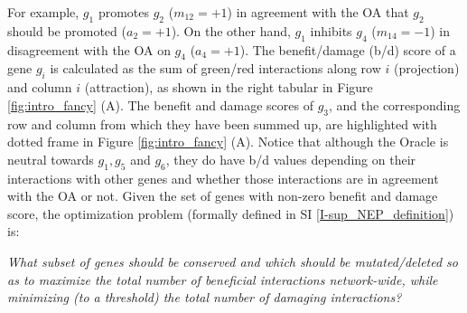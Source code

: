       For example, $g_1$ promotes  $g_2$ ($m_{12}=+1$) in agreement with the OA that $g_2$ should be promoted ($a_2=+1$). On the other hand, $g_1$ inhibits  $g_4$ ($m_{14}=-1$) in disagreement with the OA on $g_4$ ($a_4=+1$). The benefit/damage (b/d) score of a gene $g_i$ is calculated as the sum of green/red interactions along row $i$ (projection) and column $i$ (attraction), as shown in the right tabular in Figure \ref{fig:intro_fancy} (A). The benefit and damage scores of $g_3$, and the corresponding row and column from which they have been summed up, are highlighted with dotted frame in Figure \ref{fig:intro_fancy} (A). Notice that although the Oracle is neutral towards $g_1,g_5$ and $g_6$, they do have b/d values depending on their interactions with other genes and whether those interactions are in agreement with the OA or not.
      Given the set of genes with non-zero benefit and damage score, the optimization problem (formally defined in SI \ref{I-sup_NEP_definition}) is:

      \textit{What subset of genes should be conserved and which should be mutated/deleted so as to maximize  the total number of beneficial interactions network-wide, while minimizing (to a threshold) the total number of damaging interactions?}


      \begin{comment}
          An interaction $m_{jk}$ is beneficial if it is in agreement with what the Oracle says $g_k$ should be (i.e. either $(m_{jk}=+1$ AND $a_k=+1)$ OR $(m_{jk}=-1$ AND $a_k=-1)$), and damaging if it is in disagreement with what the Oracle says $g_k$ should be (i.e. either $(m_{jk}=+1$ AND $a_k=-1)$ OR $(m_{jk}=-1$ AND $a_k=+1)$). Each gene $g_j$ is henceforth assigned a benefit (damage) score $b_j$ ($d_j$) depending on how many beneficial (damaging) interactions it \textit{projects} onto or \textit{attracts} from other genes through its outgoing and incoming edges, respectively. Each beneficial (damaging) interaction therefore adds $|m_{jk}|$ to the benefit (damage) score of both the source gene $g_j$ and the target gene $g_k$. The rationale of accounting for both projection and attraction is to make the model indifferent to their distribution of the in- and out-degree of a gene.
      \end{comment}
